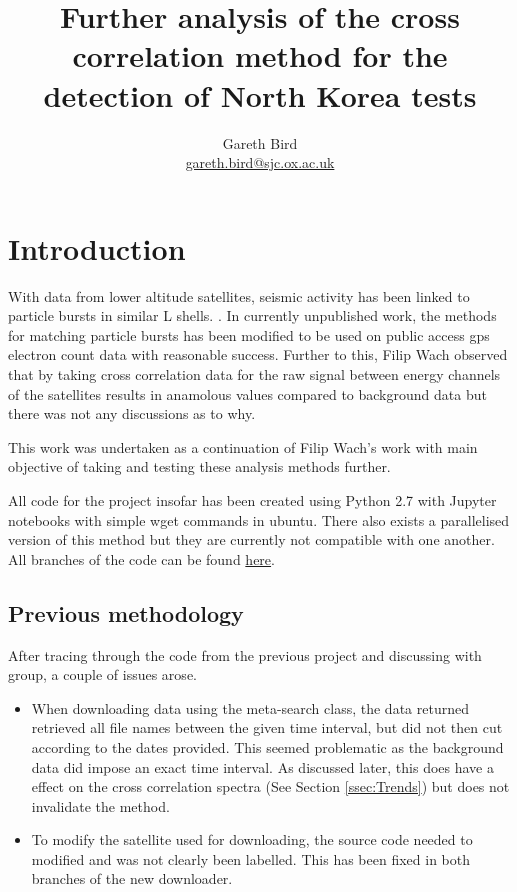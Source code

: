 \documentclass[12pt,a4paper]{article}
\title{Further analysis of the cross correlation method for the detection of North Korea tests}
\author{Gareth Bird \\ \href{mailto:gareth.bird@sjc.ox.ac.uk}{gareth.bird@sjc.ox.ac.uk}}
\affil{University of Oxford}
\begin{document}
\maketitle
\begin{abstract}
	
\end{abstract}
\section{Introduction}
	With data from lower altitude satellites, seismic activity has been linked to particle bursts in similar L shells. \cite{aleksandrin2003high}. In currently unpublished work, the methods for matching particle bursts has been modified to be used on public access gps electron count data with reasonable success. Further to this, Filip Wach observed that by taking cross correlation data for the raw signal between energy channels of the satellites results in anamolous values compared to background data but there was not any discussions as to why.\cite{filipwach2017}
	
	This work was undertaken as a continuation of Filip Wach's work with main objective of taking and testing these analysis methods further.
	
	All code for the project insofar has been created using Python 2.7 with Jupyter notebooks with simple wget commands in ubuntu. There also exists a parallelised version of this method but they are currently not compatible with one another. All branches of the code can be found \href{https://github.com/fw14863/SP_2017/network}{here}.
	
	\subsection{Previous methodology}
	After tracing through the code from the previous project and discussing with group, a couple of issues arose.
	\begin{itemize}
		\item
		When downloading data using the meta-search class, the data returned retrieved all file names between the given time interval, but did not then cut according to the dates provided. This seemed problematic as the background data did impose an exact time interval. As discussed later, this does have a effect on the cross correlation spectra (See Section \ref{ssec:Trends}) but does not invalidate the method.
		\item
		To modify the satellite used for downloading, the source code needed to modified and was not clearly been labelled. This has been fixed in both branches of the new downloader.
	\end{itemize}
	
\end{document}

